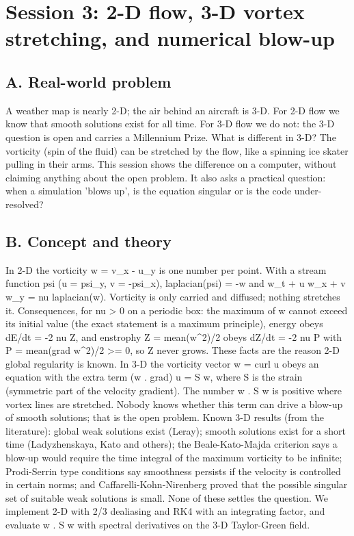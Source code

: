 \documentclass[11pt,a4paper]{article}
\begin{document}
\section{Session 3: 2-D flow, 3-D vortex stretching, and numerical blow-up}

\subsection*{A. Real-world problem}
A weather map is nearly 2-D; the air behind an aircraft is 3-D. For 2-D flow we know that smooth solutions exist for all time. For 3-D flow we do not: the 3-D question is open and carries a Millennium Prize. What is different in 3-D? The vorticity (spin of the fluid) can be stretched by the flow, like a spinning ice skater pulling in their arms. This session shows the difference on a computer, without claiming anything about the open problem. It also asks a practical question: when a simulation 'blows up', is the equation singular or is the code under-resolved?

\subsection*{B. Concept and theory}
In 2-D the vorticity w = v\_x - u\_y is one number per point. With a stream function psi (u = psi\_y, v = -psi\_x), laplacian(psi) = -w and w\_t + u w\_x + v w\_y = nu laplacian(w). Vorticity is only carried and diffused; nothing stretches it. Consequences, for nu \textgreater{} 0 on a periodic box: the maximum of \textbar{}w\textbar{} cannot exceed its initial value (the exact statement is a maximum principle), energy obeys dE/dt = -2 nu Z, and enstrophy Z = mean(w\textasciicircum{}2)/2 obeys dZ/dt = -2 nu P with P = mean(\textbar{}grad w\textbar{}\textasciicircum{}2)/2 \textgreater{}= 0, so Z never grows. These facts are the reason 2-D global regularity is known. In 3-D the vorticity vector w = curl u obeys an equation with the extra term (w . grad) u = S w, where S is the strain (symmetric part of the velocity gradient). The number w . S w is positive where vortex lines are stretched. Nobody knows whether this term can drive a blow-up of smooth solutions; that is the open problem. Known 3-D results (from the literature): global weak solutions exist (Leray); smooth solutions exist for a short time (Ladyzhenskaya, Kato and others); the Beale-Kato-Majda criterion says a blow-up would require the time integral of the maximum vorticity to be infinite; Prodi-Serrin type conditions say smoothness persists if the velocity is controlled in certain norms; and Caffarelli-Kohn-Nirenberg proved that the possible singular set of suitable weak solutions is small. None of these settles the question. We implement 2-D with 2/3 dealiasing and RK4 with an integrating factor, and evaluate w . S w with spectral derivatives on the 3-D Taylor-Green field.
\end{document}

